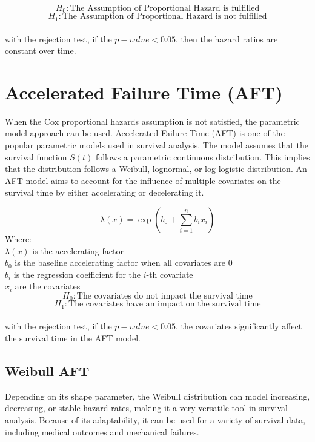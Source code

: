 \documentclass[doublespacing,12pt]{report}
\begin{document}
$$H_0: \text{The Assumption of Proportional Hazard is fulfilled} $$
$$H_1: \text{The Assumption of Proportional Hazard is not fulfilled}$$
\\with the rejection test, if the $p-value < 0.05$, then the hazard ratios are constant over time.

\section{Accelerated Failure Time (AFT)}

When the Cox proportional hazards assumption is not satisfied, the parametric model approach can be used. Accelerated Failure Time (AFT) is one of the popular parametric models used in survival analysis. The model assumes that the survival function \(S(t)\) follows a parametric continuous distribution. This implies that the distribution follows a Weibull, lognormal, or log-logistic distribution. An AFT model aims to account for the influence of multiple covariates on the survival time by either accelerating or decelerating it.

\begin{equation}
\lambda(x) = \exp(b_0 + \sum_{i=1}^{n}{b_i x_i})
\end{equation}
Where:\\
\vspace{0.1in}
     \(\lambda(x)\) is the accelerating factor \\
\vspace{0.1in}
     \(b_0\) is the baseline accelerating factor when all covariates are 0 \\
\vspace{0.1in}
     \(b_i\) is the regression coefficient for the \(i\)-th covariate \\
\vspace{0.1in}
     \(x_i\) are the covariates\\




$$
H_0: \text{The covariates do not impact the survival time} $$
$$H_1: \text{The covariates have an impact on the survival time}$$\\
with the rejection test, if the $p-value < 0.05$, the covariates significantly affect the survival time in the AFT model.



\subsection{Weibull AFT}
Depending on its shape parameter, the Weibull distribution can model increasing, decreasing, or stable hazard rates, making it a very versatile tool in survival analysis. Because of its adaptability, it can be used for a variety of survival data, including medical outcomes and mechanical failures.
\end{document}
